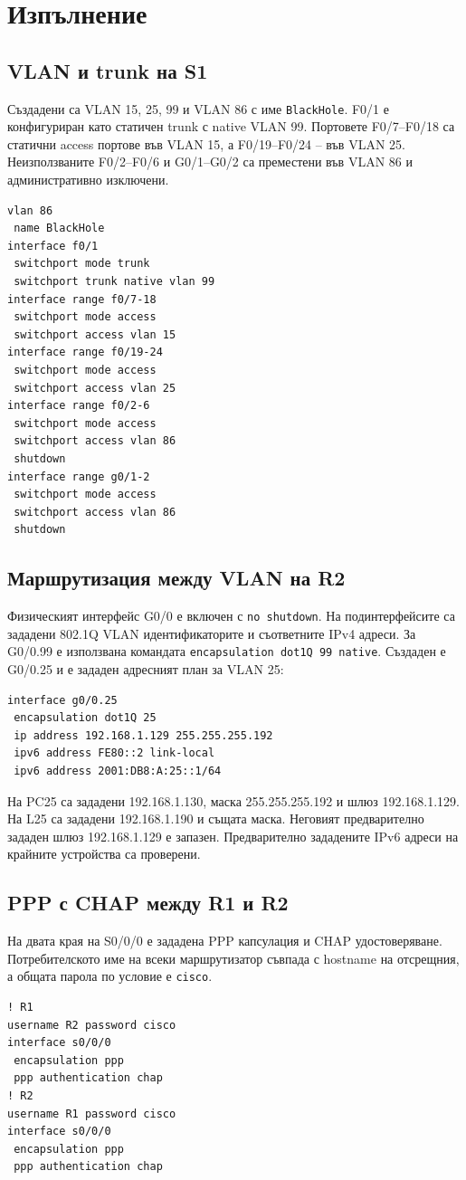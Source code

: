 \documentclass[12pt]{article}
\begin{document}
\section{Изпълнение}
\subsection{VLAN и trunk на S1}
Създадени са VLAN 15, 25, 99 и VLAN 86 с име \texttt{BlackHole}. F0/1 е конфигуриран като статичен trunk с native VLAN 99. Портовете F0/7--F0/18 са статични access портове във VLAN 15, а F0/19--F0/24 -- във VLAN 25. Неизползваните F0/2--F0/6 и G0/1--G0/2 са преместени във VLAN 86 и административно изключени.
\begin{lstlisting}
vlan 86
 name BlackHole
interface f0/1
 switchport mode trunk
 switchport trunk native vlan 99
interface range f0/7-18
 switchport mode access
 switchport access vlan 15
interface range f0/19-24
 switchport mode access
 switchport access vlan 25
interface range f0/2-6
 switchport mode access
 switchport access vlan 86
 shutdown
interface range g0/1-2
 switchport mode access
 switchport access vlan 86
 shutdown
\end{lstlisting}

\subsection{Маршрутизация между VLAN на R2}
Физическият интерфейс G0/0 е включен с \texttt{no shutdown}. На подинтерфейсите са зададени 802.1Q VLAN идентификаторите и съответните IPv4 адреси. За G0/0.99 е използвана командата \texttt{encapsulation dot1Q 99 native}. Създаден е G0/0.25 и е зададен адресният план за VLAN 25:
\begin{lstlisting}
interface g0/0.25
 encapsulation dot1Q 25
 ip address 192.168.1.129 255.255.255.192
 ipv6 address FE80::2 link-local
 ipv6 address 2001:DB8:A:25::1/64
\end{lstlisting}
На PC25 са зададени 192.168.1.130, маска 255.255.255.192 и шлюз 192.168.1.129. На L25 са зададени 192.168.1.190 и същата маска. Неговият предварително зададен шлюз 192.168.1.129 е запазен. Предварително зададените IPv6 адреси на крайните устройства са проверени.

\subsection{PPP с CHAP между R1 и R2}
На двата края на S0/0/0 е зададена PPP капсулация и CHAP удостоверяване. Потребителското име на всеки маршрутизатор съвпада с hostname на отсрещния, а общата парола по условие е \texttt{cisco}.
\begin{lstlisting}
! R1
username R2 password cisco
interface s0/0/0
 encapsulation ppp
 ppp authentication chap
! R2
username R1 password cisco
interface s0/0/0
 encapsulation ppp
 ppp authentication chap
\end{lstlisting}
\end{document}
